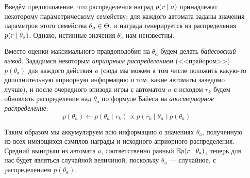 Введём предположение, что распределения наград $p(r \HM\mid a)$ принадлежат некоторому параметрическому семейству; для каждого автомата заданы значения параметров этого семейства $\theta_a \HM\in \Theta$, и награда генерируется из распределения $p(r \HM\mid \theta_a)$. Однако, истинные значения $\theta_a$ нам неизвестны.

Вместо оценки максимального правдоподобия на $\theta_a$ будем делать \emph{байесовский вывод}. Зададимся некоторым \emph{априорным распределением} (<<прайором>>) $p(\theta_a)$ для каждого действия $a$ (сюда мы можем в том числе положить какую-то дополнительную априорную информацию о том, какие автоматы заведомо лучше), и после очередного эпизода игры с автоматом $a$ с исходом $r_k$ будем обновлять распределение над $\theta_a$ по формуле Байеса на \emph{апостериорное распределение}:
$$p(\theta_a) \leftarrow p(\theta_a \mid r_k) \propto p(r_k \mid \theta_a)p(\theta_a)$$

Таким образом мы аккумулируем всю информацию о значениях $\theta_a$, полученную из всех имеющихся сэмплов награды и исходного априорного распределения. Средний выигрыш из автомата $a$, соответственно равный $\mathbb{E} p(r \mid \theta_a)$, теперь для нас будет являться случайной величиной, поскольку $\theta_a$ --- случайное, с распределением $p(\theta_a)$.

